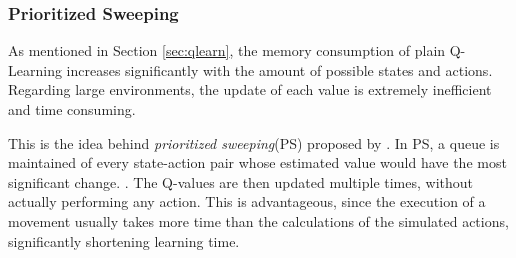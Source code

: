 \documentclass[a4paper]{article}
\begin{document}
	\subsubsection{Prioritized Sweeping}
	As mentioned in Section \ref{sec:qlearn}, the memory consumption of plain Q-Learning increases significantly with the amount of possible states and actions. Regarding large environments, the update of each value is extremely inefficient and time consuming.
	\par This is the idea behind \textit{prioritized sweeping}(PS) proposed by \citet{Moore93}. In PS, a queue is maintained of every state-action pair whose estimated value would have the most significant change. \citep{Sutton1998}. The Q-values are then updated multiple times, without actually performing any action. This is advantageous, since the execution of a movement usually takes more time than the calculations of the simulated actions, significantly shortening learning time.
	
\end{document}
